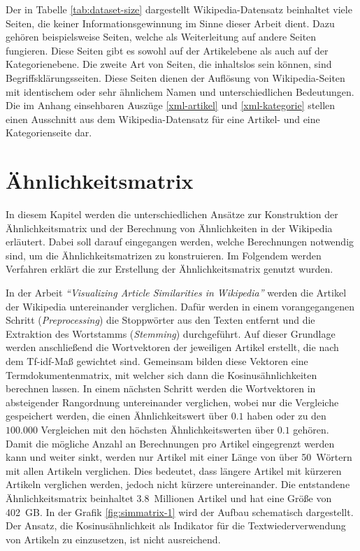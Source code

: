 Der in Tabelle \ref{tab:dataset-size} dargestellt Wikipedia-Datensatz beinhaltet viele Seiten, die keiner Informationsgewinnung im Sinne dieser Arbeit dient.
Dazu gehören beispielsweise Seiten, welche als Weiterleitung auf andere Seiten fungieren.
Diese Seiten gibt es sowohl auf der Artikelebene als auch auf der Kategorienebene.
Die zweite Art von Seiten, die inhaltslos sein können, sind Begriffsklärungsseiten.
Diese Seiten dienen der Auflösung von Wikipedia-Seiten mit identischem oder sehr ähnlichem Namen und unterschiedlichen Bedeutungen.
Die im Anhang einsehbaren Auszüge \ref{xml-artikel} und \ref{xml-kategorie} stellen einen Ausschnitt aus dem Wikipedia-Datensatz für eine Artikel- und eine Kategorienseite dar.


 

\section{Ähnlichkeitsmatrix} \label{subchap:simmatrix}
In diesem Kapitel werden die unterschiedlichen Ansätze zur Konstruktion der Ähnlichkeitsmatrix und der Berechnung von Ähnlichkeiten in der Wikipedia erläutert.
Dabei soll darauf eingegangen werden, welche Berechnungen notwendig sind, um die Ähnlichkeitsmatrizen zu konstruieren.
Im Folgendem werden Verfahren erklärt die zur Erstellung der Ähnlichkeitsmatrix genutzt wurden.


In der Arbeit \emph{"`Visualizing Article Similarities in Wikipedia"'} \cite{riehmann2016visualizing} werden die Artikel der Wikipedia untereinander verglichen.
Dafür werden in einem vorangegangenen Schritt (\emph{Preprocessing}) die Stoppwörter aus den Texten entfernt und die Extraktion des Wortstamms (\emph{Stemming}) durchgeführt. Auf dieser Grundlage werden anschließend die Wortvektoren der jeweiligen Artikel erstellt, die nach dem Tf-idf-Ma{\ss} gewichtet sind.
Gemeinsam bilden diese Vektoren eine Termdokumentenmatrix, mit welcher sich dann die Kosinusähnlichkeiten berechnen lassen.
In einem nächsten Schritt werden die Wortvektoren in absteigender Rangordnung untereinander verglichen, wobei nur die Vergleiche gespeichert werden, die einen Ähnlichkeitswert über $0.1$ haben oder zu den $100.000$ Vergleichen mit den höchsten Ähnlichkeitswerten über $0.1$ gehören.
Damit die mögliche Anzahl an Berechnungen pro Artikel eingegrenzt werden kann und weiter sinkt, werden nur Artikel mit einer Länge von über 50~Wörtern mit allen Artikeln verglichen.
Dies bedeutet, dass längere Artikel mit kürzeren Artikeln verglichen werden, jedoch nicht kürzere untereinander.
Die entstandene Ähnlichkeitsmatrix beinhaltet 3.8~Millionen Artikel und hat eine Größe von 402~GB.
In der Grafik \ref{fig:simmatrix-1} wird der Aufbau schematisch dargestellt.
Der Ansatz, die Kosinusähnlichkeit als Indikator für die Textwiederverwendung von Artikeln zu einzusetzen, ist nicht ausreichend. 

